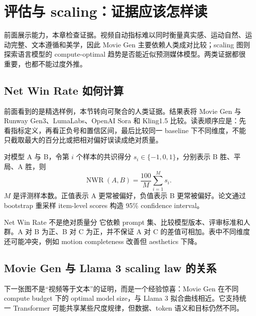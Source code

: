 \section{评估与 scaling：证据应该怎样读}

前面展示能力，本章检查证据。视频自动指标难以同时衡量真实感、运动自然、运动完整、文本遵循和美学，因此 Movie Gen 主要依赖人类成对比较；scaling 图则探索语言模型的 compute-optimal 趋势是否能近似预测媒体模型。两类证据都很重要，也都不能过度外推。

\subsection{Net Win Rate 如何计算}

前面看到的是精选样例，本节转向可聚合的人类证据。结果表将 Movie Gen 与 Runway Gen3、LumaLabs、OpenAI Sora 和 Kling1.5 比较。读表顺序应是：先看指标定义，再看正负号和置信区间，最后比较同一 baseline 下不同维度，不能只截取最大的百分比或把相对偏好误读成绝对质量。


对模型 A 与 B，令第 $i$ 个样本的共识得分 $s_i\in\{-1,0,1\}$，分别表示 B 胜、平局、A 胜，则
\[
\operatorname{NWR}(A,B)=\frac{100}{M}\sum_{i=1}^{M}s_i.
\]
$M$ 是评测样本数。正值表示 A 更常被偏好，负值表示 B 更常被偏好。论文通过 bootstrap 重采样 item-level scores 构造 95\% confidence interval。

\begin{warningbox}{Net Win Rate 不是绝对质量分}
它依赖 prompt 集、比较模型版本、评审标准和人群。A 对 B 为正、B 对 C 为正，并不保证 A 对 C 的差值可相加。表中不同维度还可能冲突，例如 motion completeness 改善但 aesthetics 下降。
\end{warningbox}


\subsection{Movie Gen 与 Llama 3 scaling law 的关系}

下一张图不是“视频等于文本”的证明，而是一个经验惊喜：Movie Gen 在不同 compute budget 下的 optimal model size，与 Llama 3 拟合曲线相近。它支持统一 Transformer 可能共享某些尺度规律，但数据、token 语义和目标仍然不同。

